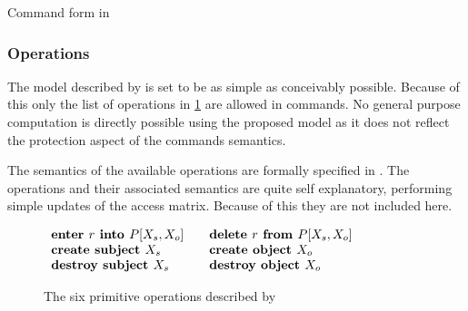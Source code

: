 \begin{algorithm}
 \DontPrintSemicolon
 \cmd {} 
 \caption{Command form in \cite{HRU}\label{protection:command}}
\end{algorithm}

\subsubsection{Operations}
The model described by \cite{HRU} is set to be as simple as conceivably possible.
Because of this only the list of operations in \cref{protection:operations} are allowed in commands.
No general purpose computation is directly possible using the proposed model as it does not reflect the protection aspect of the commands semantics.

The semantics of the available operations are formally specified in \cite[p. 463]{HRU}.
The operations and their associated semantics are quite self explanatory, performing simple updates of the access matrix.
Because of this they are not included here.

\begin{figure}
\centering
$\begin{array}{l l}
  \textbf{enter } r \textbf{ into } P[X_s, X_o]\quad & \textbf{delete } r \textbf{ from } P[X_s, X_o]\\
  \textbf{create subject } X_s & \textbf{create object } X_o\\
  \textbf{destroy subject } X_s & \textbf{destroy object } X_o
 \end{array}$
 \caption{The six primitive operations described by \cite{HRU}}
 \label{protection:operations}
\end{figure}
